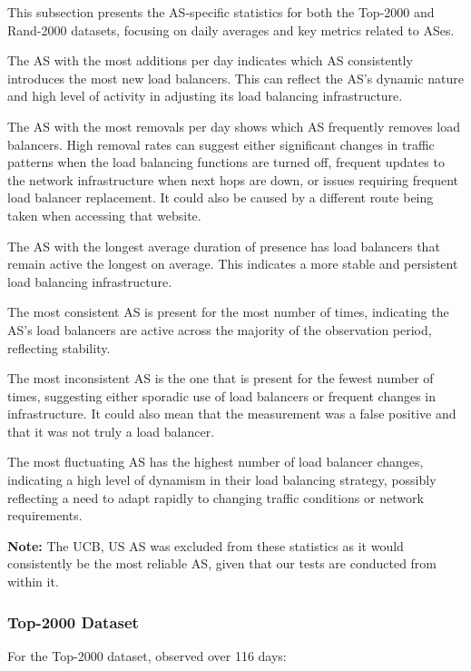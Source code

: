\documentclass[12pt]{cwru_thesis}
\begin{document}
This subsection presents the AS-specific statistics for both the Top-2000 and Rand-2000 datasets, focusing on daily averages and key metrics related to ASes.

The AS with the most additions per day indicates which AS consistently introduces the most new load balancers. This can reflect the AS's dynamic nature and high level of activity in adjusting its load balancing infrastructure.

The AS with the most removals per day shows which AS frequently removes load balancers. High removal rates can suggest either significant changes in traffic patterns when the load balancing functions are turned off, frequent updates to the network infrastructure when next hops are down, or issues requiring frequent load balancer replacement. It could also be caused by a different route being taken when accessing that website. 

The AS with the longest average duration of presence has load balancers that remain active the longest on average. This indicates a more stable and persistent load balancing infrastructure.

The most consistent AS is present for the most number of times, indicating the AS's load balancers are active across the majority of the observation period, reflecting stability.

The most inconsistent AS is the one that is present for the fewest number of times, suggesting either sporadic use of load balancers or frequent changes in infrastructure. It could also mean that the measurement was a false positive and that it was not truly a load balancer.

The most fluctuating AS has the highest number of load balancer changes, indicating a high level of dynamism in their load balancing strategy, possibly reflecting a need to adapt rapidly to changing traffic conditions or network requirements.

\textbf{Note:} The UCB, US AS was excluded from these statistics as it would consistently be the most reliable AS, given that our tests are conducted from within it.\\

\subsubsection{Top-2000 Dataset}

For the Top-2000 dataset, observed over 116 days:
\end{document}
